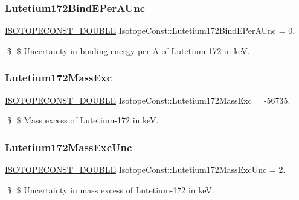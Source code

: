 \subsubsection{\texorpdfstring{Lutetium172\+Bind\+E\+Per\+A\+Unc}{Lutetium172BindEPerAUnc}}
{\footnotesize\ttfamily \mbox{\hyperlink{group___isotope_const-_macros_ga8f45a7272ce02c0b4c65c44636ed719a}{I\+S\+O\+T\+O\+P\+E\+C\+O\+N\+S\+T\+\_\+\+D\+O\+U\+B\+LE}} Isotope\+Const\+::\+Lutetium172\+Bind\+E\+Per\+A\+Unc = 0.}

\$ \$ Uncertainty in binding energy per A of Lutetium-\/172 in keV. \mbox{\label{group___isotope_const-_lutetium-_lu172_gad14fee4f86682a56d98cc045528087f5}} 
\subsubsection{\texorpdfstring{Lutetium172\+Mass\+Exc}{Lutetium172MassExc}}
{\footnotesize\ttfamily \mbox{\hyperlink{group___isotope_const-_macros_ga8f45a7272ce02c0b4c65c44636ed719a}{I\+S\+O\+T\+O\+P\+E\+C\+O\+N\+S\+T\+\_\+\+D\+O\+U\+B\+LE}} Isotope\+Const\+::\+Lutetium172\+Mass\+Exc = -\/56735.}

\$ \$ Mass excess of Lutetium-\/172 in keV. \mbox{\label{group___isotope_const-_lutetium-_lu172_ga68aa66e93b1698b4947193111a68d72f}} 
\subsubsection{\texorpdfstring{Lutetium172\+Mass\+Exc\+Unc}{Lutetium172MassExcUnc}}
{\footnotesize\ttfamily \mbox{\hyperlink{group___isotope_const-_macros_ga8f45a7272ce02c0b4c65c44636ed719a}{I\+S\+O\+T\+O\+P\+E\+C\+O\+N\+S\+T\+\_\+\+D\+O\+U\+B\+LE}} Isotope\+Const\+::\+Lutetium172\+Mass\+Exc\+Unc = 2.}

\$ \$ Uncertainty in mass excess of Lutetium-\/172 in keV. \mbox{\label{group___isotope_const-_lutetium-_lu172_ga5e69092ba5f09c68811864db3c079998}} 
